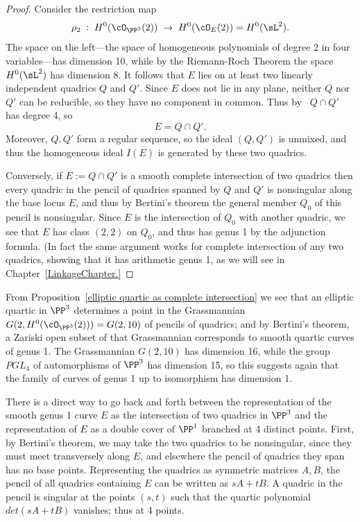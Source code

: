 \begin{proof}
Consider the restriction map
$$
\rho_2 \;  : \; H^0(\cO_{\PP^3}(2)) \; \to \; H^0(\cO_{E}(2)) = H^0(\sL^2).
$$
The space on the left---the space of homogeneous polynomials of degree 2 in four variables---has dimension 10, while by the Riemann-Roch Theorem the space $H^0(\sL^2)$ has dimension 8. It follows that $E$ lies on at least two linearly independent quadrics $Q$ and $Q'$. Since $E$ does not lie in any plane, neither $Q$ nor $Q'$ can be reducible, so they have no component in common.
Thus by \bt\ $Q \cap Q' $ has degree 4, so
$$
E =Q \cap Q'.
$$
Moreover, $Q,Q'$ form a regular sequence, so the ideal $(Q,Q')$ is unmixed, and thus the homogeneous ideal $I(E)$ is generated by
these two quadrics. 

Conversely, if $E := Q\cap Q'$ is a smooth complete intersection of two quadrics then  every quadric in the pencil of quadrics
spanned by $Q$ and $Q'$ is nonsingular along the base locus $E$, and thus by Bertini's theorem the general member $Q_0$ of this
pencil is nonsingular. Since $E$ is the intersection of $Q_0$ with another quadric, we see that $E$ has class $(2,2)$ on $Q_0$,
and thus has genus 1 by the adjunction formula. (In fact the same argument works for complete intersection of any two quadrics,
showing that it has arithmetic genus 1, as we will see in Chapter~\ref{LinkageChapter.}
\end{proof}

From Proposition~\ref{elliptic quartic as complete intersection} we see that an elliptic quartic in $\PP^3$
determines a point in the Grassmannian $G(2, H^0(\cO_{\PP^3}(2))) = G(2, 10)$ of pencils of quadrics; and by Bertini's theorem, a Zariski open subset of that Grassmannian corresponds to smooth quartic curves of genus 1. The Grassmannian $G(2,10)$ has dimension 16, while the group $PGL_4$ of automorphisms of $\PP^3$ has dimension 15, so this suggests again that the family of curves of genus 1 up to isomorphism has dimension 1.

There is a direct way to go back and forth between the representation of the smooth genus 1 curve $E$ as the intersection of two quadrics in $\PP^3$ and the representation of $E$ as a double cover
of $\PP^1$ branched at 4 distinct points. First, by Bertini's theorem, we may take the two quadrics to be nonsingular, since they must meet transversely along $E$, and elsewhere the
pencil of quadrics they span has no base points. Representing the quadrics as symmetric matrices $A,B$, the pencil of all quadrics containing $E$ can be 
written as $sA+tB$. A quadric in the pencil is singular at the points $(s,t)$ such that the quartic polynomial $det(sA+tB)$ vanishes; thus at 4 points.

